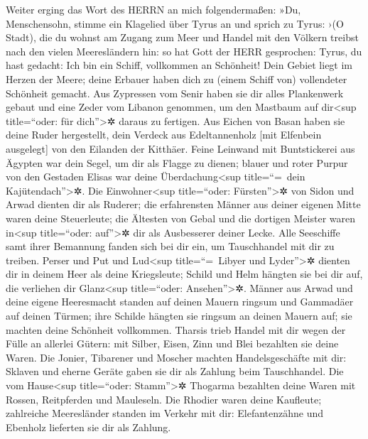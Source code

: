 Weiter erging das Wort des HERRN an mich folgendermaßen:
»Du, Menschensohn, stimme ein Klagelied über Tyrus an
und sprich zu Tyrus: ›(O Stadt), die du wohnst am Zugang
zum Meer und Handel mit den Völkern treibst nach den vielen
Meeresländern hin: so hat Gott der HERR gesprochen: Tyrus, du hast
gedacht: Ich bin ein Schiff, vollkommen an Schönheit! Dein
Gebiet liegt im Herzen der Meere; deine Erbauer haben dich zu (einem
Schiff von) vollendeter Schönheit gemacht. Aus Zypressen
vom Senir haben sie dir alles Plankenwerk gebaut und eine Zeder vom
Libanon genommen, um den Mastbaum auf dir\textless sup title=``oder: für
dich''\textgreater✲ daraus zu fertigen. Aus Eichen von
Basan haben sie deine Ruder hergestellt, dein Verdeck aus Edeltannenholz
{[}mit Elfenbein ausgelegt{]} von den Eilanden der Kitthäer.
Feine Leinwand mit Buntstickerei aus Ägypten war dein
Segel, um dir als Flagge zu dienen; blauer und roter Purpur von den
Gestaden Elisas war deine Überdachung\textless sup title=``=~dein
Kajütendach''\textgreater✲. Die Einwohner\textless sup
title=``oder: Fürsten''\textgreater✲ von Sidon und Arwad dienten dir als
Ruderer; die erfahrensten Männer aus deiner eigenen Mitte waren deine
Steuerleute; die Ältesten von Gebal und die dortigen
Meister waren in\textless sup title=``oder: auf''\textgreater✲ dir als
Ausbesserer deiner Lecke. Alle Seeschiffe samt ihrer Bemannung fanden
sich bei dir ein, um Tauschhandel mit dir zu treiben.
Perser und Put und Lud\textless sup title=``=~Libyer und
Lyder''\textgreater✲ dienten dir in deinem Heer als deine Kriegsleute;
Schild und Helm hängten sie bei dir auf, die verliehen dir
Glanz\textless sup title=``oder: Ansehen''\textgreater✲.
Männer aus Arwad und deine eigene Heeresmacht standen auf
deinen Mauern ringsum und Gammadäer auf deinen Türmen; ihre Schilde
hängten sie ringsum an deinen Mauern auf; sie machten deine Schönheit
vollkommen. Tharsis trieb Handel mit dir wegen der Fülle
an allerlei Gütern: mit Silber, Eisen, Zinn und Blei bezahlten sie deine
Waren. Die Jonier, Tibarener und Moscher machten
Handelsgeschäfte mit dir: Sklaven und eherne Geräte gaben sie dir als
Zahlung beim Tauschhandel. Die vom Hause\textless sup
title=``oder: Stamm''\textgreater✲ Thogarma bezahlten deine Waren mit
Rossen, Reitpferden und Mauleseln. Die Rhodier waren
deine Kaufleute; zahlreiche Meeresländer standen im Verkehr mit dir:
Elefantenzähne und Ebenholz lieferten sie dir als Zahlung.
